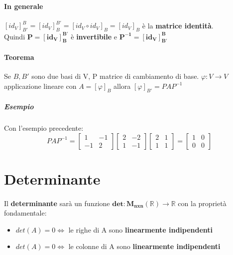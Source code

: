 \documentclass[a4paper, 12pt]{report}
\begin{document}
        \paragraph{In generale} $[id_V]^B_{B'}= [id_V]^{B'}_B=[id_V \circ id_V]_B=[id_V]_B$ è la \textbf{matrice identità}.\\
        Quindi $\boldsymbol{P=[id_V]^{B'}_B}$ è \textbf{invertibile} e $\boldsymbol{P^{-1}=[id_V]^B_{B'}}$
        \paragraph{Teorema} Se $B, B'$ sono due basi di V, P matrice di cambiamento di base.
        $\varphi: V \rightarrow V$ applicazione lineare con $A=[\varphi]_B$ allora $[\varphi]_{B'}=PAP^{-1}$
        \subparagraph{Esempio} Con l'esempio precedente:
        $$
        PAP^{-1}= 
        \begin{bmatrix}
            1 & -1\\
            -1 & 2
        \end{bmatrix}
        \begin{bmatrix}
            2 & -2\\
            1 & -1
        \end{bmatrix}
        \begin{bmatrix}
            2 & 1\\
            1 & 1
        \end{bmatrix}
        =\begin{bmatrix}
            1 & 0\\
            0 & 0
        \end{bmatrix}
        $$
    \section{Determinante}
    \paragraph{} Il \textbf{determinante} sarà un funzione $\boldsymbol{det:M_{nxn}(\mathbb{R})\rightarrow \mathbb{R}}$ con la proprietà fondamentale:
    \begin{itemize}
        \item $det(A)=0 \Leftrightarrow$ le righe di A sono \textbf{linearmente indipendenti}
        \item $det(A)=0 \Leftrightarrow$ le colonne di A sono \textbf{linearmente indipendenti}
    \end{itemize}
\end{document}
